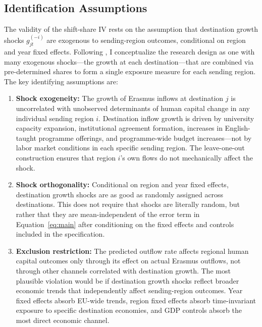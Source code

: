 \documentclass[12pt]{article}
\begin{document}
\subsection{Identification Assumptions}
\label{sec:identification}

The validity of the shift-share IV rests on the assumption that destination growth shocks $g_{jt}^{(-i)}$ are exogenous to sending-region outcomes, conditional on region and year fixed effects. Following \citet{borusyak_hull_jaravel_2022}, I conceptualize the research design as one with many exogenous shocks---the growth at each destination---that are combined via pre-determined shares to form a single exposure measure for each sending region. The key identifying assumptions are:

\begin{enumerate}
    \item \textbf{Shock exogeneity:} The growth of Erasmus inflows at destination $j$ is uncorrelated with unobserved determinants of human capital change in any individual sending region $i$. Destination inflow growth is driven by university capacity expansion, institutional agreement formation, increases in English-taught programme offerings, and programme-wide budget increases---not by labor market conditions in each specific sending region. The leave-one-out construction ensures that region $i$'s own flows do not mechanically affect the shock.

    \item \textbf{Shock orthogonality:} Conditional on region and year fixed effects, destination growth shocks are as good as randomly assigned across destinations. This does not require that shocks are literally random, but rather that they are mean-independent of the error term in Equation~\eqref{eq:main} after conditioning on the fixed effects and controls included in the specification.

    \item \textbf{Exclusion restriction:} The predicted outflow rate affects regional human capital outcomes only through its effect on actual Erasmus outflows, not through other channels correlated with destination growth. The most plausible violation would be if destination growth shocks reflect broader economic trends that independently affect sending-region outcomes. Year fixed effects absorb EU-wide trends, region fixed effects absorb time-invariant exposure to specific destination economies, and GDP controls absorb the most direct economic channel.
\end{enumerate}
\end{document}
